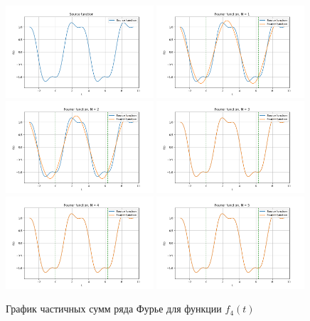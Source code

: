 \begin{figure}[ht!]
    \centering
    \includegraphics[width=0.49\textwidth]{media/plots/func_4.png}
    \includegraphics[width=0.49\textwidth]{media/plots/func_4_N_1.png}
    \includegraphics[width=0.49\textwidth]{media/plots/func_4_N_2.png}
    \includegraphics[width=0.49\textwidth]{media/plots/func_4_N_3.png}
    \includegraphics[width=0.49\textwidth]{media/plots/func_4_N_4.png}
    \includegraphics[width=0.49\textwidth]{media/plots/func_4_N_5.png}
    \caption{График частичных сумм ряда Фурье для функции $f_4(t)$}
    \label{fig:func_4_plot}
\end{figure}

